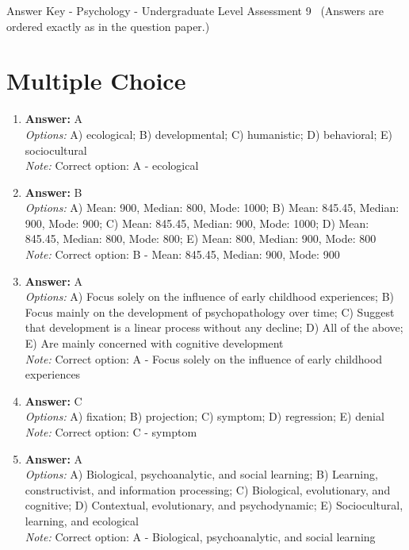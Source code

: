 \documentclass[12pt]{article}
\begin{document}
\begin{center}
Answer Key - Psychology - Undergraduate Level Assessment 9 \
\small (Answers are ordered exactly as in the question paper.)
\end{center}

\section*{Multiple Choice}
\begin{enumerate}[label=\arabic*.]
\item \textbf{Answer:} A
\\ \textit{Options:} A) ecological; B) developmental; C) humanistic; D) behavioral; E) sociocultural
\\ \textit{Note:} Correct option: A - ecological
\item \textbf{Answer:} B
\\ \textit{Options:} A) Mean: 900, Median: 800, Mode: 1000; B) Mean: 845.45, Median: 900, Mode: 900; C) Mean: 845.45, Median: 900, Mode: 1000; D) Mean: 845.45, Median: 800, Mode: 800; E) Mean: 800, Median: 900, Mode: 800
\\ \textit{Note:} Correct option: B - Mean: 845.45, Median: 900, Mode: 900
\item \textbf{Answer:} A
\\ \textit{Options:} A) Focus solely on the influence of early childhood experiences; B) Focus mainly on the development of psychopathology over time; C) Suggest that development is a linear process without any decline; D) All of the above; E) Are mainly concerned with cognitive development
\\ \textit{Note:} Correct option: A - Focus solely on the influence of early childhood experiences
\item \textbf{Answer:} C
\\ \textit{Options:} A) fixation; B) projection; C) symptom; D) regression; E) denial
\\ \textit{Note:} Correct option: C - symptom
\item \textbf{Answer:} A
\\ \textit{Options:} A) Biological, psychoanalytic, and social learning; B) Learning, constructivist, and information processing; C) Biological, evolutionary, and cognitive; D) Contextual, evolutionary, and psychodynamic; E) Sociocultural, learning, and ecological
\\ \textit{Note:} Correct option: A - Biological, psychoanalytic, and social learning
\end{enumerate}
\end{document}
